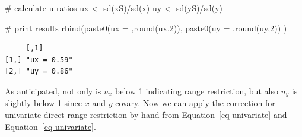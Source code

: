 \documentclass[
  letterpaper,
  DIV=11,
  numbers=noendperiod]{scrreprt}
\newenvironment{Shaded}{\begin{snugshade}}{\end{snugshade}}
\newcommand{\CommentTok}[1]{\textcolor[rgb]{0.37,0.37,0.37}{#1}}
\newcommand{\DecValTok}[1]{\textcolor[rgb]{0.68,0.00,0.00}{#1}}
\newcommand{\FunctionTok}[1]{\textcolor[rgb]{0.28,0.35,0.67}{#1}}
\newcommand{\NormalTok}[1]{\textcolor[rgb]{0.00,0.23,0.31}{#1}}
\newcommand{\OtherTok}[1]{\textcolor[rgb]{0.00,0.23,0.31}{#1}}
\newcommand{\SpecialCharTok}[1]{\textcolor[rgb]{0.37,0.37,0.37}{#1}}
\newcommand{\StringTok}[1]{\textcolor[rgb]{0.13,0.47,0.30}{#1}}
\begin{document}
\begin{Shaded}
\begin{Highlighting}[]
\CommentTok{\# calculate u{-}ratios}
\NormalTok{ux }\OtherTok{\textless{}{-}} \FunctionTok{sd}\NormalTok{(xS)}\SpecialCharTok{/}\FunctionTok{sd}\NormalTok{(x)}
\NormalTok{uy }\OtherTok{\textless{}{-}} \FunctionTok{sd}\NormalTok{(yS)}\SpecialCharTok{/}\FunctionTok{sd}\NormalTok{(y)}

\CommentTok{\# print results}
\FunctionTok{rbind}\NormalTok{(}\FunctionTok{paste0}\NormalTok{(}\StringTok{\textquotesingle{}ux = \textquotesingle{}}\NormalTok{,}\FunctionTok{round}\NormalTok{(ux,}\DecValTok{2}\NormalTok{)),}
      \FunctionTok{paste0}\NormalTok{(}\StringTok{\textquotesingle{}uy = \textquotesingle{}}\NormalTok{,}\FunctionTok{round}\NormalTok{(uy,}\DecValTok{2}\NormalTok{))}
\NormalTok{      )}
\end{Highlighting}
\end{Shaded}

\begin{verbatim}
     [,1]       
[1,] "ux = 0.59"
[2,] "uy = 0.86"
\end{verbatim}

As anticipated, not only is \(u_x\) below 1 indicating range
restriction, but also \(u_y\) is slightly below 1 since \(x\) and \(y\)
covary. Now we can apply the correction for univariate direct range
restriction by hand from Equation~\ref{eq-univariate} and
Equation~\ref{eq-univariate}.
\end{document}
